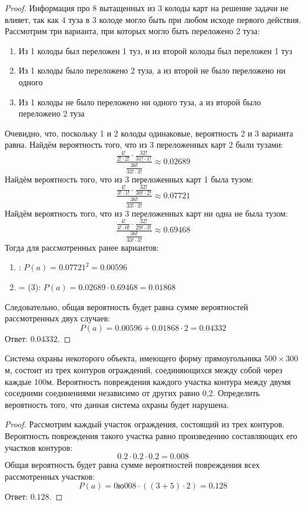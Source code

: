 \begin{proof}
	Информация про 8 вытащенных из 3 колоды карт на решение задачи не влияет, так как 4 туза в 3 колоде могло быть при любом исходе первого действия.
	\newline
	Рассмотрим три варианта, при которых могло быть переложено 2 туза:
	\begin{enumerate} 
		\item Из 1 колоды был переложен 1 туз, и из второй колоды был переложен 1 туз
		\item Из 1 колоды было переложено 2 туза, а из второй не было переложено ни одного
		\item Из 1 колоды не было переложено ни одного туза, а из второй было переложено 2 туза
	\end{enumerate}
	Очевидно, что, поскольку 1 и 2 колоды одинаковые, вероятность 2 и 3 варианта равна.
	\newline
	Найдём вероятность того, что из 3 переложенных карт 2 были тузами:
	\[
		\frac{\frac{4!}{2!\cdot2!}\cdot\frac{32!}{31!\cdot1!}}{\frac{36!}{33!\cdot3!}}\approx0.02689
	\]
	Найдём вероятность того, что из 3 переложенных карт 1 была тузом:
	\[	
		\frac{\frac{4!}{3!\cdot1!}\cdot\frac{32!}{30!\cdot2!}}{\frac{36!}{33!\cdot3!}}\approx0.07721
	\]
	Найдём вероятность того, что из 3 переложенных карт ни одна не была тузом:
	\[	
		\frac{\frac{4!}{4!\cdot0!}\cdot\frac{32!}{29!\cdot3!}}{\frac{36!}{33!\cdot3!}}\approx0.69468
	\]
	Тогда для рассмотренных ранее вариантов:
	\begin{enumerate} 
		\item: $P(a)=0.07721^2=0.00596$
		\item = (3): $P(a)=0.02689\cdot0.69468=0.01868$
	\end{enumerate}
	Следовательно, общая вероятность будет равна сумме вероятностей рассмотренных двух случаев:
	\[
		P(a)=0.00596+0.01868\cdot2=0.04332
	\]
	Ответ: $0.04332$.
\end{proof}

\begin{problem}
	Система охраны некоторого объекта, имеющего форму прямоугольника $500\times300$м, состоит из трех контуров ограждений, соединяющихся между собой через каждые 100м. Вероятность повреждения каждого участка контура между двумя соседними соединениями независимо от других равно 0,2. Определить вероятность того, что данная система охраны будет нарушена.
\end{problem}

\begin{proof}
	Рассмотрим каждый участок ограждения, состоящий из трех контуров. Вероятность повреждения такого участка равно произведению составляющих его участков контуров:
	\[	
		0.2\cdot0.2\cdot0.2=0.008
	\]
	Общая вероятность будет равна сумме вероятностей повреждения всех рассмотренных участков:
	\[
		P(a)=0ю008\cdot((3+5)\cdot2)=0.128
	\]
	Ответ: $0.128$.
\end{proof}

